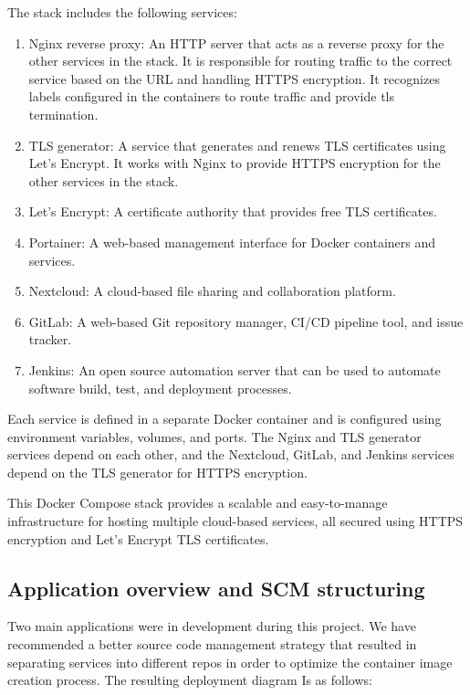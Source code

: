The stack includes the following services: 
\begin{enumerate}
\item Nginx reverse proxy: An HTTP server that acts as a reverse proxy for the other services in the stack. It is responsible for routing traffic to the correct service based on the URL and handling HTTPS encryption. It recognizes labels configured in the containers to route traffic and provide tls termination. 
\item TLS generator: A service that generates and renews TLS certificates using Let's Encrypt. It works with Nginx to provide HTTPS encryption for the other services in the stack. 
\item Let's Encrypt: A certificate authority that provides free TLS certificates. 
\item Portainer: A web-based management interface for Docker containers and services. 
\item Nextcloud: A cloud-based file sharing and collaboration platform. 
\item GitLab: A web-based Git repository manager, CI/CD pipeline tool, and issue tracker. 
\item Jenkins: An open source automation server that can be used to automate software build, test, and deployment processes. 
\end{enumerate}

Each service is defined in a separate Docker container and is configured using environment variables, volumes, and ports. The Nginx and TLS generator services depend on each other, and the Nextcloud, GitLab, and Jenkins services depend on the TLS generator for HTTPS encryption. 

This Docker Compose stack provides a scalable and easy-to-manage infrastructure for hosting multiple cloud-based services, all secured using HTTPS encryption and Let's Encrypt TLS certificates. 

\subsection{Application overview and SCM structuring}

Two main applications were in development during this project. We have recommended a better source code management strategy that resulted in separating services into different repos in order to optimize the container image creation process. The resulting deployment diagram Is as follows: 

